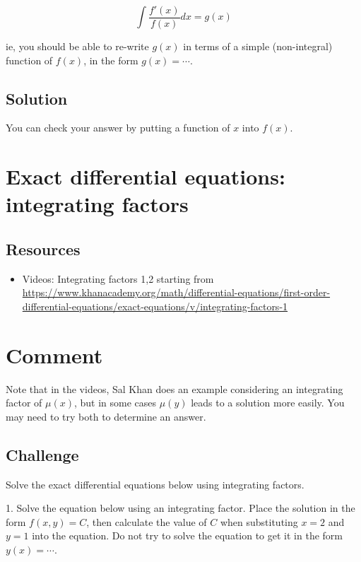 \begin{equation}
    \int \frac{f'(x)}{f(x)} dx = g(x)
\end{equation}

ie, you should be able to re-write $g(x)$ in terms of a simple (non-integral) function of $f(x)$, in the form $g(x) = \cdots$.

\subsection*{Solution}
You can check your answer by putting a function of $x$ into $f(x)$.




\newpage
\section{Exact differential equations: integrating factors}
\label{sec:edeif}

\subsection*{Resources}
\begin{itemize}
    \item Videos: Integrating factors 1,2 starting from \url{https://www.khanacademy.org/math/differential-equations/first-order-differential-equations/exact-equations/v/integrating-factors-1}
\end{itemize}

\section*{Comment}
Note that in the videos, Sal Khan does an example considering an integrating factor of $\mu(x)$, but in some cases $\mu(y)$ leads to a solution more easily. You may need to try both to determine an answer.

\subsection*{Challenge}
Solve the exact differential equations below using integrating factors.

1. Solve the equation below using an integrating factor. Place the solution in the form $f(x,y) = C$, then calculate the value of $C$ when substituting $x=2$ and $y=1$ into the equation. Do not try to solve the equation to get it in the form $y(x)=\cdots$.

